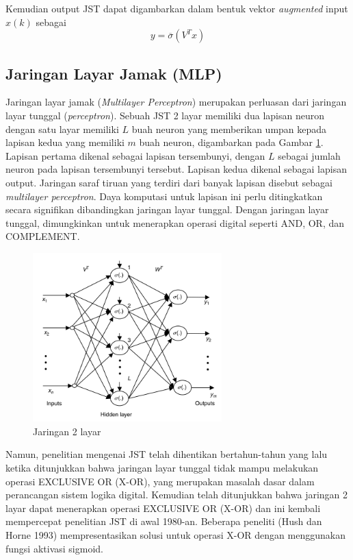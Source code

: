 Kemudian output JST dapat digambarkan dalam bentuk vektor \textit{augmented} input $x(k)$ sebagai
\vspace{0em}
\begin{equation} \label{eq:3:finalVector}
y = \overline{\sigma}(V^Tx)
\end{equation}

\subsection{Jaringan Layar Jamak (MLP)}
Jaringan layar jamak (\textit{Multilayer Perceptron}) merupakan perluasan dari jaringan layar tunggal (\textit{perceptron}). Sebuah JST 2 layar memiliki dua lapisan neuron dengan satu layar memiliki $L$ buah neuron yang memberikan umpan kepada lapisan kedua yang memiliki $m$ buah neuron, digambarkan pada Gambar \ref{fig:3:mlp}. Lapisan pertama dikenal sebagai lapisan tersembunyi, dengan $L$ sebagai jumlah neuron pada lapisan tersembunyi tersebut. Lapisan kedua dikenal sebagai lapisan output. Jaringan saraf tiruan yang terdiri dari banyak lapisan disebut sebagai \textit{multilayer perceptron}. Daya komputasi untuk lapisan ini perlu ditingkatkan secara signifikan dibandingkan jaringan layar tunggal. Dengan jaringan layar tunggal, dimungkinkan untuk menerapkan operasi digital seperti AND, OR, dan COMPLEMENT. 
\begin{figure}[!h]
	\centering
	\includegraphics[width=0.65\textwidth]{figures/mlp}
	\caption{Jaringan 2 layar \cite{NNControlBook}}
	\label{fig:3:mlp}
\end{figure}
Namun, penelitian mengenai JST telah dihentikan bertahun-tahun yang lalu ketika ditunjukkan bahwa jaringan layar tunggal tidak mampu melakukan operasi EXCLUSIVE OR (X-OR), yang merupakan masalah dasar dalam perancangan sistem logika digital. Kemudian telah ditunjukkan bahwa jaringan 2 layar dapat menerapkan operasi EXCLUSIVE OR (X-OR) dan ini kembali mempercepat penelitian JST di awal 1980-an. Beberapa peneliti (Hush dan Horne 1993) mempresentasikan solusi untuk operasi X-OR dengan menggunakan fungsi aktivasi sigmoid. \cite{NNControlBook}

